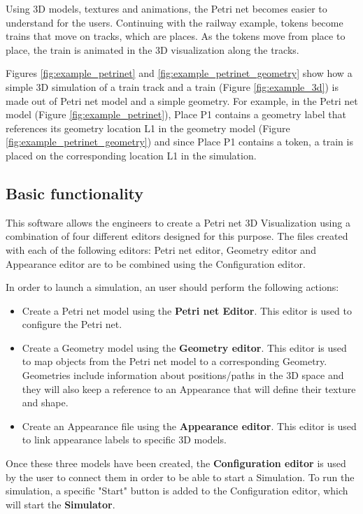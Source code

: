 Using 3D models, textures and animations, the Petri net becomes easier to understand for the users. Continuing with the railway example, tokens become trains that move on tracks, which are places. As the tokens move from place to place, the train is animated in the 3D visualization along the tracks.

Figures \ref{fig:example_petrinet} and \ref{fig:example_petrinet_geometry} show how a simple 3D simulation of a train track and a train (Figure \ref{fig:example_3d}) is made out of Petri net model and a simple geometry. For example, in the Petri net model (Figure \ref{fig:example_petrinet}), Place P1 contains a geometry label that references its geometry location L1 in the geometry model (Figure \ref{fig:example_petrinet_geometry}) and since Place P1 contains a token, a train is placed on the corresponding location L1 in the simulation. 

\newpage

\subsection{Basic functionality}
This software allows the engineers to create a Petri net 3D Visualization using a combination of four different editors designed for this purpose.
The files created with each of the following editors: \newline
Petri net editor, Geometry editor and Appearance editor are to be combined using the Configuration editor. 

In order to launch a simulation, an user should perform the following actions:

\begin{itemize}
  \item Create a Petri net model using the \textbf{Petri net Editor}. This editor is used to configure the Petri net.
  \item Create a Geometry model using the \textbf{Geometry editor}. This editor is used to map objects from the Petri net model to a corresponding Geometry. Geometries include information about positions/paths in the 3D space and they will also keep a reference to an Appearance that will define their texture and shape.
  \item Create an Appearance file using the \textbf{Appearance editor}. This editor is used to link appearance labels to specific 3D models.  
\end{itemize}

Once these three models have been created, the \textbf{Configuration editor} is used by the user to connect them in order to be able to start a Simulation. 
To run the simulation, a specific "Start" button is added to the Configuration editor, which will start the \textbf{Simulator}.
\newline


